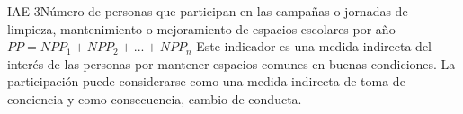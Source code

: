 \begin{indicador}{IAE 3}{Número de personas que participan en las campañas o jornadas de limpieza, mantenimiento o mejoramiento de espacios escolares por año}
	{$PP = NPP_1 + NPP_2 + ... + NPP_n$} 
	{
		Este indicador es una medida indirecta del interés de las personas por mantener espacios comunes en buenas condiciones. La participación puede considerarse como una medida indirecta de toma de conciencia y como consecuencia, cambio de conducta.\\
		
	} 	
\end{indicador}
